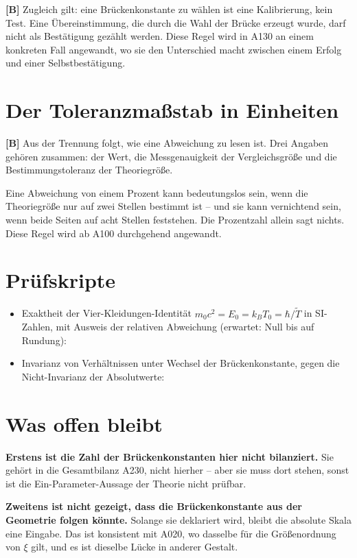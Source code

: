\textbf{[B]} Zugleich gilt: eine Brückenkonstante zu wählen ist eine
Kalibrierung, kein Test. Eine Übereinstimmung, die durch die Wahl der Brücke
erzeugt wurde, darf nicht als Bestätigung gezählt werden. Diese Regel wird in
A130 an einem konkreten Fall angewandt, wo sie den Unterschied macht zwischen
einem Erfolg und einer Selbstbestätigung.

\section{Der Toleranzmaßstab in Einheiten}

\textbf{[B]} Aus der Trennung folgt, wie eine Abweichung zu lesen ist. Drei
Angaben gehören zusammen: der Wert, die Messgenauigkeit der Vergleichsgröße und
die Bestimmungstoleranz der Theoriegröße.

Eine Abweichung von einem Prozent kann bedeutungslos sein, wenn die
Theoriegröße nur auf zwei Stellen bestimmt ist -- und sie kann vernichtend sein,
wenn beide Seiten auf acht Stellen feststehen. Die Prozentzahl allein sagt
nichts. Diese Regel wird ab A100 durchgehend angewandt.

\section{Prüfskripte}

\begin{itemize}
  \item Exaktheit der Vier-Kleidungen-Identität $m_0c^2=E_0=k_BT_0=\hbar/\tilde T$
    in SI-Zahlen, mit Ausweis der relativen Abweichung (erwartet: Null bis auf
    Rundung): 
  \item Invarianz von Verhältnissen unter Wechsel der Brückenkonstante, gegen
    die Nicht-Invarianz der Absolutwerte:
\end{itemize}

\section{Was offen bleibt}

\textbf{Erstens ist die Zahl der Brückenkonstanten hier nicht bilanziert.} Sie
gehört in die Gesamtbilanz A230, nicht hierher -- aber sie muss dort stehen,
sonst ist die Ein-Parameter-Aussage der Theorie nicht prüfbar.

\textbf{Zweitens ist nicht gezeigt, dass die Brückenkonstante aus der Geometrie
folgen könnte.} Solange sie deklariert wird, bleibt die absolute Skala eine
Eingabe. Das ist konsistent mit A020, wo dasselbe für die Größenordnung von
$\xi$ gilt, und es ist dieselbe Lücke in anderer Gestalt.

